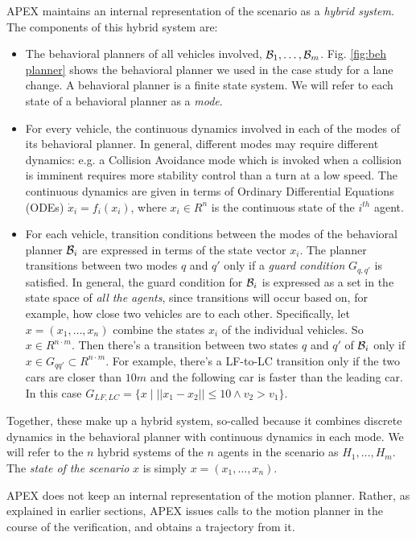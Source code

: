 APEX maintains an internal representation of the scenario as a \emph{hybrid system}.
The components of this hybrid system are:
\begin{itemize}
	\item The behavioral planners of all vehicles involved, $\mathcal{B}_1,\ldots,\mathcal{B}_m$.
	Fig. \ref{fig:beh planner} shows the behavioral planner we used in the case study for a lane change.
	A behavioral planner is a finite state system. 
	We will refer to each state of a behavioral planner as a \emph{mode}.	
	\item For every vehicle, the continuous dynamics involved in each of the modes of its behavioral planner.
	In general, different modes may require different dynamics: e.g. a Collision Avoidance mode which is invoked when a collision is imminent requires more stability control than a turn at a low speed.
	The continuous dynamics are given in terms of Ordinary Differential Equations (ODEs) $\dot{x}_i = f_i(x_i)$, 
	where $x_i \in R^n$ is the continuous state of the $i^{th}$ agent.
	\item For each vehicle, transition conditions between the modes of the behavioral planner $\mathcal{B}_i$ are expressed in terms of the state vector $x_i$.
	The planner transitions between two modes $q$ and $q'$ only if a \emph{guard condition} $G_{q,q'}$ is satisfied.
	In general, the guard condition for $\mathcal{B}_i$ is expressed as a set in the state space of \emph{all the agents}, since transitions will occur based on, for example, how close two vehicles are to each other.
	Specifically, let $x = (x_1,\ldots,x_n)$ combine the states $x_i$ of the individual vehicles.
	So $x \in R^{n\cdot m}$.
	Then there's a transition between two states $q$ and $q'$ of $\mathcal{B}_i$ only if $x \in G_{qq'} \subset R^{n\cdot m}$.
	For example, there's a LF-to-LC transition only if the two cars are closer than $10m$ and the following car is faster than the leading car.
	In this case $G_{LF,LC} = \{x \;|\; ||x_1 - x_2|| \leq 10 \land v_2 > v_1\}$.
\end{itemize}
Together, these make up a hybrid system, so-called because it combines discrete dynamics in the behavioral planner with continuous dynamics in each mode.
We will refer to the $n$ hybrid systems of the $n$ agents in the scenario as $H_1,\ldots,H_m$.
The \emph{state of the scenario} $x$ is simply $x = (x_1,\ldots,x_n)$.

APEX does not keep an internal representation of the motion planner. 
Rather, as explained in earlier sections, APEX issues calls to the motion planner in the course of the verification, and obtains a trajectory from it.

